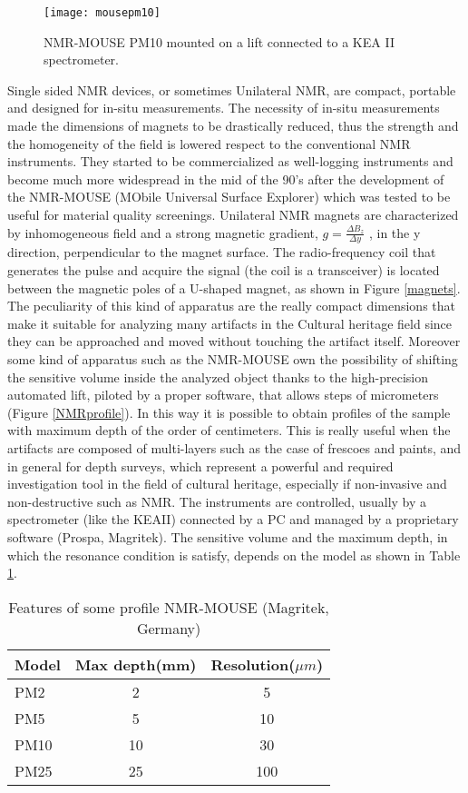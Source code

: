 \documentclass[a4paper,11pt]{report}
\begin{document}
\begin{figure}[h]
      	\centering
      	\texttt{[image: mousepm10]}
      	\caption{NMR-MOUSE PM10 mounted on a lift connected to a KEA II spectrometer.}\label{mousepm10}
      \end{figure}
Single sided NMR devices, or sometimes Unilateral NMR, are compact, portable and designed for in-situ measurements. The necessity of in-situ measurements made the dimensions of magnets to be drastically reduced, thus the strength and 
the homogeneity of the field is lowered respect to the conventional NMR instruments.
They started to be commercialized as well-logging instruments and become much more widespread in the mid of the 90's after the development of the NMR-MOUSE (MObile Universal Surface Explorer) which was tested to be useful for material quality screenings\cite{cinque}. Unilateral NMR magnets are characterized by inhomogeneous field and a strong magnetic gradient, $g=\frac{\Delta B_z}{\Delta y}$ , in the y direction, perpendicular to the magnet surface.
The radio-frequency coil that generates the pulse and acquire the signal (the coil is a transceiver) is located between the magnetic poles of a U-shaped magnet, as shown in Figure \ref{magnets}. The peculiarity of this kind of apparatus are the really compact dimensions that make it suitable for analyzing many artifacts in the Cultural heritage field since they can be approached and moved without touching the artifact itself. Moreover some kind of apparatus such as the NMR-MOUSE own the possibility of shifting the sensitive volume inside the analyzed object thanks to the high-precision automated lift, piloted by a proper software, that allows steps of micrometers (Figure \ref{NMRprofile}). In this way it is possible to obtain profiles of the sample with maximum depth of the order of centimeters. This is really useful when the artifacts are composed of multi-layers such as the case of frescoes and paints, and in general for depth surveys, which represent a powerful and required investigation tool in the field of cultural heritage, especially if non-invasive and non-destructive such as NMR. The instruments are controlled, usually by a spectrometer (like the KEAII) connected by a PC and managed by a proprietary software (Prospa, Magritek). The sensitive volume and the maximum depth, in which the resonance condition is satisfy, depends on the model as shown in Table \ref{Table:1}. 


\begin{table}[h] 
\centering
\begin{tabular}{lcc}

\toprule
Model  & Max depth(mm) & Resolution($\mu m$) \\
\midrule
PM2 &2 & 5\\
PM5 & 5&10 \\
PM10 &10 & 30\\
PM25 & 25& 100\\
\bottomrule

\end{tabular}

\caption{Features of some profile  NMR-MOUSE (Magritek, Germany)}\label{Table:1}

\end{table}
\end{document}
